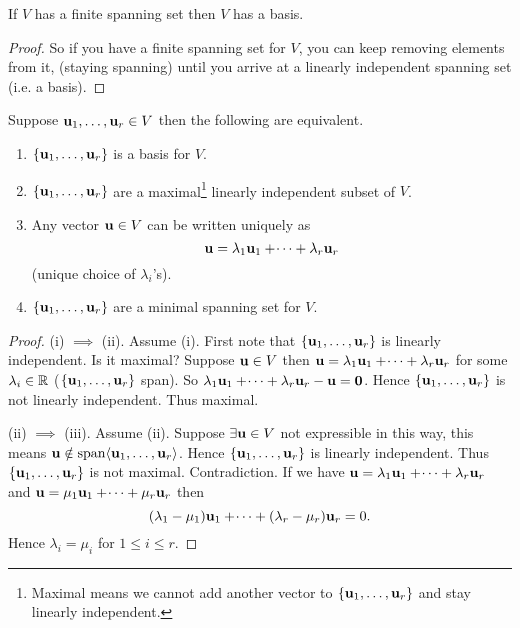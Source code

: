 \documentclass[10pt, a4paper]{article}
\begin{document}
\begin{theorem}
    If $V$ has a finite spanning set then $V$ has a basis.
    \begin{proof}
        So if you have a finite spanning set for $V$,
        you can keep removing elements from it,
        (staying spanning)
        until you arrive at a linearly independent spanning set
        (i.e. a basis).
    \end{proof}
\end{theorem}

\begin{theorem}
    Suppose $\mathbf{u}_1, \dotsc, \mathbf{u}_r \in V$ then the following are equivalent.
    \begin{enumerate}[label = (\roman*)]
        \item $\{\mathbf{u}_1, \dotsc, \mathbf{u}_r\}$ is a basis for $V$.
        \item $\{\mathbf{u}_1, \dotsc, \mathbf{u}_r\}$ are a maximal\footnote{Maximal means we cannot add another vector to $\{\mathbf{u}_1, \dotsc, \mathbf{u}_r\}$ and stay linearly independent.}
        linearly independent subset of $V$.
        \item Any vector $\mathbf{u} \in V$ can be written uniquely as
        \[
        \mathbf{u} = \lambda_1\mathbf{u}_1 + \dotsi + \lambda_r\mathbf{u}_r
        \]
        (unique choice of $\lambda_i$'s).
        \item $\{\mathbf{u}_1, \dotsc, \mathbf{u}_r\}$ are a minimal spanning set for $V$.
    \end{enumerate}
    \begin{proof}
        (i) $\implies$ (ii).
        Assume (i).
        First note that $\{\mathbf{u}_1, \dotsc, \mathbf{u}_r\}$ is linearly independent.
        Is it maximal?
        Suppose $\mathbf{u} \in V$ then $\mathbf{u} = \lambda_1\mathbf{u}_1 + \dotsi + \lambda_r\mathbf{u}_r$ for some $\lambda_i \in \mathbb{R}$
        ($\{\mathbf{u}_1, \dotsc, \mathbf{u}_r\}$ span).
        So $\lambda_1\mathbf{u}_1 + \dotsi + \lambda_r\mathbf{u}_r - \mathbf{u} = \mathbf{0}$.
        Hence $\{\mathbf{u}_1, \dotsc, \mathbf{u}_r\}$ is not linearly independent.
        Thus maximal.

        (ii) $\implies$ (iii).
        Assume (ii).
        Suppose $\exists\mathbf{u} \in V$ not expressible in this way,
        this means $\mathbf{u} \notin \mathrm{span}\langle\mathbf{u}_1, \dotsc, \mathbf{u}_r\rangle$.
        Hence $\{\mathbf{u}_1, \dotsc, \mathbf{u}_r\}$ is linearly independent.
        Thus $\{\mathbf{u}_1, \dotsc, \mathbf{u}_r\}$ is not maximal.
        Contradiction.
        If we have $\mathbf{u} = \lambda_1\mathbf{u}_1 + \dotsi + \lambda_r\mathbf{u}_r$ and $\mathbf{u} = \mu_1\mathbf{u}_1 + \dotsi + \mu_r\mathbf{u}_r$ then
        \[
        (\lambda_1 - \mu_1)\mathbf{u}_1 + \dotsi + (\lambda_r - \mu_r)\mathbf{u}_r = 0.
        \]
        Hence $\lambda_i = \mu_i$ for $1 \leq i \leq r$.


\end{proof}
\end{theorem}
\end{document}
